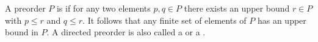A preorder $P$ is  if for any two elements $p, q \in P$ there exists an upper bound $r \in P$ with $p \leq r$ and $q \leq r$. It follows that any finite set of elements of $P$ has an upper bound in $P$. A directed preorder is also called a  or a .
